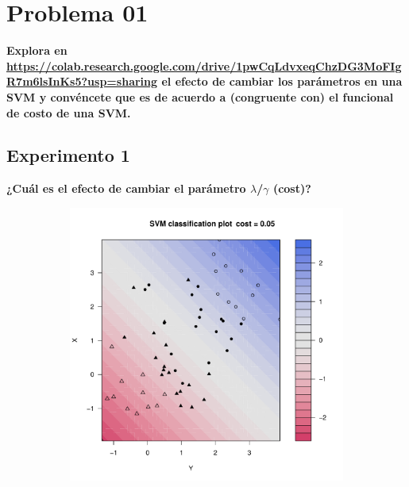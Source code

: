 \section*{Problema 01}

\textbf{Explora en
	\url{https://colab.research.google.com/drive/1pwCqLdvxeqChzDG3MoFIgR7m6lsInKs5?usp=sharing} el efecto de cambiar los parámetros en una SVM y convéncete que es de acuerdo a (congruente con) el funcional de costo de una SVM.}

\subsection*{Experimento 1}

\textbf{¿Cuál es el efecto de cambiar el parámetro $\lambda$/$\gamma$ (cost)?}

\begin{figure}[H]
	\centering
	\begin{subfigure}{0.24\linewidth}
		\includegraphics[width=1\linewidth]{Graphics/Problema_01/Experiment_01_1.pdf}
		\caption{}
	\end{subfigure}
	\begin{subfigure}{0.24\linewidth}

\end{subfigure}
\end{figure}
